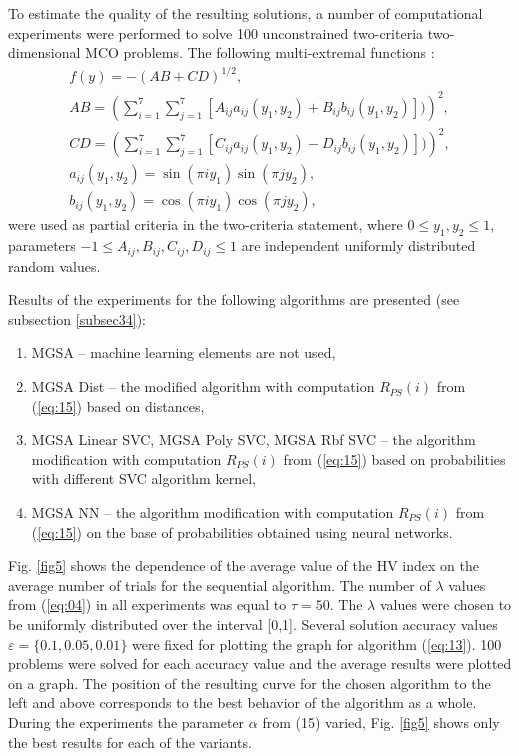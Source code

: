 \documentclass[runningheads]{llncs}
\begin{document}
To estimate the quality of the resulting solutions, a number of computational experiments were performed to solve 100 unconstrained two-criteria two-dimensional MCO problems. The following multi-extremal functions \cite{Gergel2019_2}:
\begin{equation}
    \label{eq:16}
		\begin{matrix}
		  f(y)= -(AB + CD)^{1/2}, \\
			AB =(\sum_{i=1}^7{\sum_{j=1}^7{[A_{ij} a_{ij} (y_1,y_2) + B_{ij} b_{ij} (y_1,y_2)])}})^2, \\
			CD =(\sum_{i=1}^7{\sum_{j=1}^7{[C_{ij} a_{ij} (y_1,y_2) - D_{ij} b_{ij} (y_1,y_2)])}})^2, \\
			a_{ij} (y_1,y_2) = \sin(\pi i y_1) \sin(\pi j y_2), \\
			b_{ij} (y_1,y_2) = \cos(\pi i y_1) \cos(\pi j y_2),
		\end{matrix}
\end{equation}
were used as partial criteria in the two-criteria statement, where $0 \leq y_1, y_2 \leq 1$, parameters $-1 \leq A_{ij},B_{ij},C_{ij},D_{ij} \leq 1$ are independent uniformly distributed random values.

Results of the experiments for the following algorithms are presented (see subsection \ref{subsec34}):
\begin{enumerate}
	\item MGSA -- machine learning elements are not used,
	\item MGSA Dist -- the modified algorithm with computation $R_{PS}(i)$ from (\ref{eq:15}) based on distances,
	\item MGSA Linear SVC, MGSA Poly SVC, MGSA Rbf SVC -- the algorithm modification with computation $R_{PS}(i)$ from (\ref{eq:15}) based on probabilities with different SVC algorithm kernel,
	\item MGSA NN -- the algorithm modification with computation $R_{PS}(i)$ from (\ref{eq:15}) on the base of probabilities obtained using neural networks.
\end{enumerate}
	
Fig. \ref{fig5} shows the dependence of the average value of the HV index on the average number of trials for the sequential algorithm. The number of $\lambda$ values from (\ref{eq:04}) in all experiments was equal to $\tau=50$. The $\lambda$ values were chosen to be uniformly distributed over the interval [0,1]. Several solution accuracy values $\varepsilon = \{0.1,0.05,0.01\}$ were fixed for plotting the graph for algorithm (\ref{eq:13}). 100 problems were solved for each accuracy value and the average results were plotted on a graph. The position of the resulting curve for the chosen algorithm to the left and above corresponds to the best behavior of the algorithm as a whole. During the experiments the parameter $\alpha$ from (15) varied, Fig. \ref{fig5} shows only the best results for each of the variants.
\end{document}

